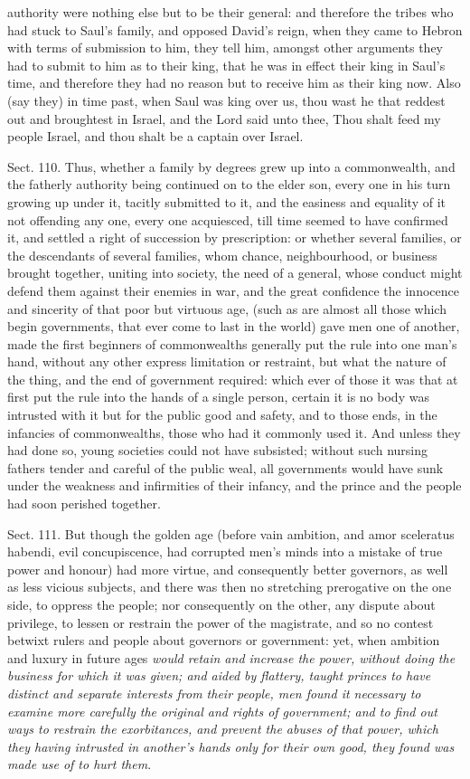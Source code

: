 \documentclass[11pt,openany]{book}
\begin{document}
authority were nothing else but to be their general: and therefore the tribes who had stuck to Saul's family, and opposed David's reign, when they came to Hebron with terms of submission to him, they tell him, amongst other arguments they had to submit to him as to their king, that he was in effect their king in Saul's time, and therefore they had no reason but to receive him as their king now. Also (say they) in time past, when Saul was king over us, thou wast he that reddest out and broughtest in Israel, and the Lord said unto thee, Thou shalt feed my people Israel, and thou shalt be a captain over Israel.

Sect. 110. Thus, whether a family by degrees grew up into a commonwealth, and the fatherly authority being continued on to the elder son, every one in his turn growing up under it, tacitly submitted to it, and the easiness and equality of it not offending any one, every one acquiesced, till time seemed to have confirmed it, and settled a right of succession by prescription: or whether several families, or the descendants of several families, whom chance, neighbourhood, or business brought together, uniting into society, the need of a general, whose conduct might defend them against their enemies in war, and the great confidence the innocence and sincerity of that poor but virtuous age, (such as are almost all those which begin governments, that ever come to last in the world) gave men one of another, made the first beginners of commonwealths generally put the rule into one man's hand, without any other express limitation or restraint, but what the nature of the thing, and the end of government required: which ever of those it was that at first put the rule into the hands of a single person, certain it is no body was intrusted with it but for the public good and safety, and to those ends, in the infancies of commonwealths, those who had it commonly used it. And unless they had done so, young societies could not have subsisted; without such nursing fathers tender and careful of the public weal, all governments would have sunk under the weakness and infirmities of their infancy, and the prince and the people had soon perished together.

Sect. 111. But though the golden age (before vain ambition, and amor sceleratus habendi, evil concupiscence, had corrupted men's minds into a mistake of true power and honour) had more virtue, and consequently better governors, as well as less vicious subjects, and there was then no stretching prerogative on the one side, to oppress the people; nor consequently on the other, any dispute about privilege, to lessen or restrain the power of the magistrate, and so no contest betwixt rulers and people about governors or government: yet, when ambition and luxury in future ages \emph{would retain and increase the power, without doing the business for which it was given; and aided by flattery, taught princes to have distinct and separate interests from their people, men found it necessary to examine more carefully the original and rights of government; and to find out ways to restrain the exorbitances, and prevent the abuses of that power, which they having intrusted in another's hands only for their own good, they found was made use of to hurt them}.
\end{document}
